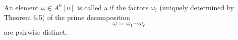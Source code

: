 An element $\omega \in A^0[u]$ is called a  if the factors $\omega_i$ (uniquely determined by Theorem 6.5) of the prime decomposition
$$\omega = \omega_1 \cdots \omega_\ell$$
are pairwise distinct.
